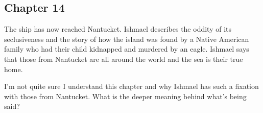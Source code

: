 \subsection{Chapter 14}

The ship has now reached Nantucket. Ishmael describes the oddity of its
seclusiveness and the story of how the island was found by a Native American
family who had their child kidnapped and murdered by an eagle. Ishmael says
that those from Nantucket are all around the world and the sea is their true
home.

I'm not quite sure I understand this chapter and why Ishmael has such a
fixation with those from Nantucket. What is the deeper meaning behind what's
being said?
